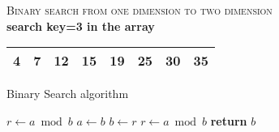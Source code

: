 \documentclass{article}
\begin{document}
\begin{table}[h]
    \centering
\textsc{\Large Binary search from one dimension to two dimension}\\[0.1cm]
\textbf{search key=3 in the array}\\
    \begin{tabular}{|c|c|c|c|c|c|c|c|}
        \cellcolor[gray]{0.5}4&\cellcolor[gray]{0.5}7&\cellcolor[gray]{0.5}12&\cellcolor[gray]{0.5}15&19&25&30&35\\\hline
    \end{tabular}
\end{table}

\begin{algorithm}
\caption{Binary Search algorithm}\label{BinSearch}
\begin{algorithmic}[1]
   \State $r\gets a\bmod b$
      \State $a\gets b$
      \State $b\gets r$
      \State $r\gets a\bmod b$
   \EndWhile\label{euclidendwhile}
   \State \textbf{return} $b$
\EndProcedure
\end{algorithmic}
\end{algorithm}
\end{document}
